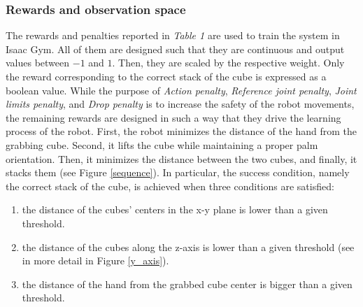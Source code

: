 \documentclass[a4paper]{article}
\begin{document}
\subsubsection{Rewards and observation space}
 The rewards and penalties reported in \textit{Table 1} are used to train the system in Isaac Gym. All of them are designed such that they are continuous and output values between $-1$ and $1$. Then, they are scaled by the respective weight. Only the reward corresponding to the correct stack of the cube is expressed as a boolean value. While the purpose of \textit{Action penalty}, \textit{Reference joint penalty}, \textit{Joint limits penalty}, and \textit{Drop penalty} is to increase the safety of the robot movements, the remaining rewards are designed in such a way that they drive the learning process of the robot. First, the robot minimizes the distance of the hand from the grabbing cube. Second, it lifts the cube while maintaining a proper palm orientation. Then, it minimizes the distance between the two cubes, and finally, it stacks them (see Figure \ref{sequence}).
In particular, the success condition, namely the correct stack of the cube, is achieved when three conditions are satisfied:
\begin{enumerate}
    \item the distance of the cubes' centers in the x-y plane is lower than a given threshold.
    \item the distance of the cubes along the z-axis is lower than a given threshold (see in more detail in Figure \ref{y_axis}).
    \item the distance of the hand from the grabbed cube center is bigger than a given threshold.
\end{enumerate}
\renewcommand{\arraystretch}{2.5}
\end{document}
